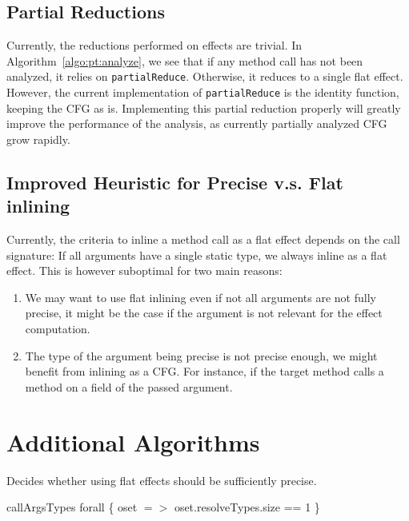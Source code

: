 \documentclass[a4paper]{article}
\begin{document}
\subsection{Partial Reductions}
Currently, the reductions performed on effects are trivial. In
Algorithm~\ref{algo:pt:analyze}, we see that if any method call has not been
analyzed, it relies on \verb=partialReduce=. Otherwise, it reduces to a
single flat effect. However, the current implementation of \verb=partialReduce=
is the identity function, keeping the CFG as is. Implementing this partial
reduction properly will greatly improve the performance of the analysis, as
currently partially analyzed CFG grow rapidly.

\subsection{Improved Heuristic for Precise v.s. Flat inlining}
Currently, the criteria to inline a method call as a flat effect depends on the
call signature: If all arguments have a single static type, we always inline as
a flat effect. This is however suboptimal for two main reasons:
\begin{enumerate}
    \item We may want to use flat inlining even if not all arguments are not fully
precise, it might be the case if the argument is not relevant for the effect
computation.
    \item The type of the argument being precise is not precise enough, we might
benefit from inlining as a CFG. For instance, if the target method calls a
method on a field of the passed argument.
\end{enumerate}

\newpage
\appendix
\section{Additional Algorithms}

\begin{algorithm}
\caption{Decides whether using flat effects should be sufficiently
precise.}\label{algo:pt:shouldwe}
\begin{algorithmic}[1]
    \State \Return callArgsTypes forall \{ oset $=>$ oset.resolveTypes.size == 1 \}
\EndFunction
\end{algorithmic}
\end{algorithm}
\end{document}

